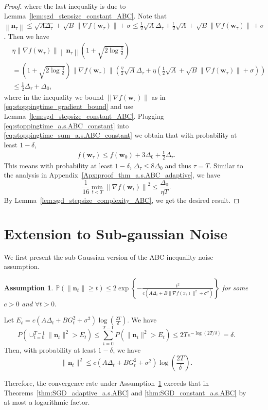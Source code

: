 \documentclass{article}
\newtheorem{assumption}{Assumption}
\newcommand{\Norm}[1]{\left\|#1\right\|}
\newcommand{\paren}[1]{\left( #1 \right)}
\newcommand{\bw}{\mathbf{w}}
\newcommand{\bn}{\mathbf{n}}
\begin{document}
\begin{proof}
where the last inequality is due to Lemma~\ref{lem:sgd_stepsize_constant_ABC}.
Note that $\Norm{\bn_\tau}\leq \sqrt{A\Delta_\tau}+\sqrt{B}\Norm{\nabla f(\bw_\tau)}+\sigma\leq \frac{1}{2}\sqrt{A}\Delta_\tau+\frac{1}{2}\sqrt{A}+\sqrt{B}\Norm{\nabla f(\bw_\tau)}+\sigma$. Then we have
\begin{equation}\label{eq:stoppingtime_a.s.ABC_constant}
    \begin{aligned}
    &\eta\Norm{\nabla f(\bw_\tau)}\Norm{\bn_\tau}\paren{1+\sqrt{2\log\frac{1}{\delta}}}\\
    &=\paren{1+\sqrt{2\log\frac{1}
    {\delta}}}\Norm{\nabla f(\bw_\tau)}\paren{\frac{\eta}{2}\sqrt{A}\Delta_\tau+\eta\paren{\frac{1}{2}\sqrt{A}+\sqrt{B}\Norm{\nabla f(\bw_\tau)}+\sigma}}\\
    &\leq \frac{1}{2}\Delta_\tau+\Delta_0,
\end{aligned}
\end{equation}
where in the inequality we bound $\Norm{\nabla f(\bw_\tau)}$ as in \eqref{eq:stoppingtime_gradient_bound} and use Lemma~\ref{lem:sgd_stepsize_constant_ABC}.
Plugging \eqref{eq:stoppingtime_a.s.ABC_constant} into \eqref{eq:stoppingtime_sum_a.s.ABC_constant} we obtain that with probability at least $1-\delta$, 
\begin{align*}
    f(\bw_\tau)\leq f(\bw_0)+3\Delta_0+\frac{1}{2}\Delta_\tau.
\end{align*}
This means with probability at least $1-\delta$, $\Delta_\tau\leq 8\Delta_0$ and thus $\tau=T$. 
Similar to the analysis in Appendix~\ref{Apx:proof_thm_a.s.ABC_adaptive}, 
we have
$$\frac{1}{16}\min_{t<T}\Norm{\nabla f(\bw_t)}^2\leq \frac{\Delta_0}{\eta T}.$$
By Lemma~\ref{lem:sgd_stepsize_complexity_ABC}, we get the desired result.
\end{proof}



\section{Extension to Sub-gaussian Noise}\label{apx:subgaussian}

We first present the sub-Gaussian version of the ABC inequality noise assumption.

\begin{assumption}\label{assumption:subgaussian_ABC}
    $\mathbb{P}\left(\|\bn_t\|\geq t\right)\leq 2\exp\left\{
-\frac{t^2}{c\left(A\Delta_t+B\|\nabla f(x_t)\|^2+\sigma^2\right)}\right\}$  for some $c>0$ and $\forall t>0$.
\end{assumption}

Let $E_t=c(A\Delta_t+BG_t^2+\sigma^2)\log\left(\frac{2T}{\delta}\right)$. We have
$$P(\cup_{t=0}^{T-1}\|\bn_t\|^2>E_t)\leq\sum_{t=0}^{T-1}P(\|\bn_t\|^2>E_t)\leq 2Te^{-\log(2T/\delta)}=\delta.$$
Then, with probability at least $1-\delta$, we have
$$\|\bn_t\|^2\leq c(A\Delta_t+BG_t^2+\sigma^2)\log\left(\frac{2T}{\delta}\right).$$

Therefore, the convergence rate under Assumption~\ref{assumption:subgaussian_ABC} exceeds that in Theorems~\ref{thm:SGD_adaptive_a.s.ABC} and \ref{thm:SGD_constant_a.s.ABC} by at most a logarithmic factor.
\end{document}
